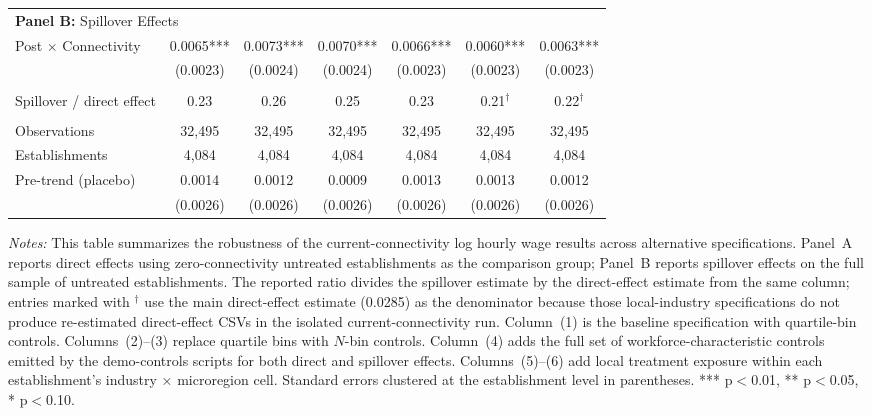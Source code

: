 \documentclass[11pt]{article}
\begin{document}
\begin{table}[H]
\begin{tabular}{lcccccc}
 \midrule
\multicolumn{7}{l}{\textbf{Panel B:} Spillover Effects} \\
Post $\times$ Connectivity & 0.0065*** & 0.0073*** & 0.0070*** & 0.0066*** & 0.0060*** & 0.0063***\\
 & (0.0023) & (0.0024) & (0.0024) & (0.0023) & (0.0023) & (0.0023)\\
 &  &  &  &  &  & \\
Spillover / direct effect & 0.23 & 0.26 & 0.25 & 0.23 & 0.21$^\dagger$ & 0.22$^\dagger$\\
 &  &  &  &  &  & \\
Observations & 32{,}495 & 32{,}495 & 32{,}495 & 32{,}495 & 32{,}495 & 32{,}495\\
Establishments & 4{,}084 & 4{,}084 & 4{,}084 & 4{,}084 & 4{,}084 & 4{,}084\\
\midrule
Pre-trend (placebo) & 0.0014 & 0.0012 & 0.0009 & 0.0013 & 0.0013 & 0.0012\\
 & (0.0026) & (0.0026) & (0.0026) & (0.0026) & (0.0026) & (0.0026)\\
\bottomrule\bottomrule
\end{tabular}
\begin{minipage}{\linewidth}
    \scriptsize\vspace{4pt}
    \textit{Notes:} This table summarizes the robustness of the current-connectivity log hourly wage results across alternative specifications. Panel~A reports direct effects using zero-connectivity untreated establishments as the comparison group; Panel~B reports spillover effects on the full sample of untreated establishments. The reported ratio divides the spillover estimate by the direct-effect estimate from the same column; entries marked with $^\dagger$ use the main direct-effect estimate (0.0285) as the denominator because those local-industry specifications do not produce re-estimated direct-effect CSVs in the isolated current-connectivity run. Column~(1) is the baseline specification with quartile-bin controls. Columns~(2)--(3) replace quartile bins with $N$-bin controls. Column~(4) adds the full set of workforce-characteristic controls emitted by the demo-controls scripts for both direct and spillover effects. Columns~(5)--(6) add local treatment exposure within each establishment's industry $\times$ microregion cell. Standard errors clustered at the establishment level in parentheses. *** p$<$0.01, ** p$<$0.05, * p$<$0.10.
\end{minipage}
\end{table}
\end{document}
